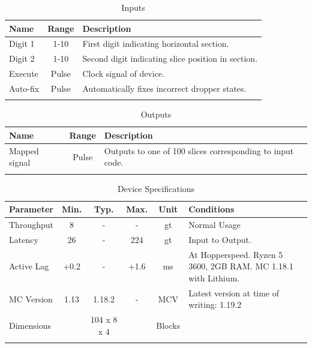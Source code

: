 \documentclass[10pt]{datasheet}
\begin{document}
\begin{table}[h]
    \caption{Inputs}
    \begin{tabularx}{\textwidth}{l | c | X}
        \thickhline
        \textbf{Name} & \textbf{Range} & \textbf{Description} \\
        \hline
        Digit 1 & 1-10 & First digit indicating horizontal section. \\
        Digit 2 & 1-10 & Second digit indicating slice position in section. \\
        \hline
        Execute & Pulse & Clock signal of device. \\
        Auto-fix & Pulse & Automatically fixes incorrect dropper states. \\
        \thickhline
\end{tabularx}
\end{table}

\begin{table}[h]
    \caption{Outputs}
    \begin{tabularx}{\textwidth}{l | c | X}
        \thickhline
        \textbf{Name} & \textbf{Range} & \textbf{Description} \\
        \hline
        Mapped signal & Pulse & Outputs to one of 100 slices corresponding to input code. \\
        \thickhline
\end{tabularx}
\end{table}

\begin{table}[h]
    \caption{Device Specifications}
    \begin{tabularx}{\textwidth}{l | c c c | c | X}
        \thickhline
        \textbf{Parameter} & \textbf{Min.} & \textbf{Typ.} & \textbf{Max.} &
        \textbf{Unit} & \textbf{Conditions} \\
        \hline
        Throughput  & 8 & - & - & gt & Normal Usage \\
        \hline
        Latency  & 26 & - & 224 & gt & Input to Output. \\
        \hline
        Active Lag & +0.2 & - & +1.6 & ms & At Hopperspeed. Ryzen 5 3600, 2GB RAM. MC 1.18.1 with Lithium. \\
        \hline
        MC Version & 1.13 & 1.18.2 & - & MCV & Latest version at time of writing: 1.19.2\\
        \hline
        Dimensions & & 104 x 8 x 4 & & Blocks & \\
        \thickhline
\end{tabularx}
\end{table}
\newpage
\end{document}
